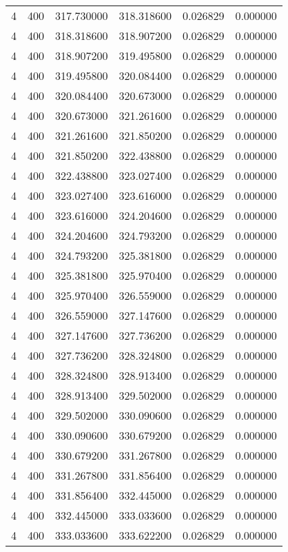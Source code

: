 \begin{longtable}{rrrrrr}
4 & 400 & 317.730000 & 318.318600 & 0.026829 & 0.000000 \\
4 & 400 & 318.318600 & 318.907200 & 0.026829 & 0.000000 \\
4 & 400 & 318.907200 & 319.495800 & 0.026829 & 0.000000 \\
4 & 400 & 319.495800 & 320.084400 & 0.026829 & 0.000000 \\
4 & 400 & 320.084400 & 320.673000 & 0.026829 & 0.000000 \\
4 & 400 & 320.673000 & 321.261600 & 0.026829 & 0.000000 \\
4 & 400 & 321.261600 & 321.850200 & 0.026829 & 0.000000 \\
4 & 400 & 321.850200 & 322.438800 & 0.026829 & 0.000000 \\
4 & 400 & 322.438800 & 323.027400 & 0.026829 & 0.000000 \\
4 & 400 & 323.027400 & 323.616000 & 0.026829 & 0.000000 \\
4 & 400 & 323.616000 & 324.204600 & 0.026829 & 0.000000 \\
4 & 400 & 324.204600 & 324.793200 & 0.026829 & 0.000000 \\
4 & 400 & 324.793200 & 325.381800 & 0.026829 & 0.000000 \\
4 & 400 & 325.381800 & 325.970400 & 0.026829 & 0.000000 \\
4 & 400 & 325.970400 & 326.559000 & 0.026829 & 0.000000 \\
4 & 400 & 326.559000 & 327.147600 & 0.026829 & 0.000000 \\
4 & 400 & 327.147600 & 327.736200 & 0.026829 & 0.000000 \\
4 & 400 & 327.736200 & 328.324800 & 0.026829 & 0.000000 \\
4 & 400 & 328.324800 & 328.913400 & 0.026829 & 0.000000 \\
4 & 400 & 328.913400 & 329.502000 & 0.026829 & 0.000000 \\
4 & 400 & 329.502000 & 330.090600 & 0.026829 & 0.000000 \\
4 & 400 & 330.090600 & 330.679200 & 0.026829 & 0.000000 \\
4 & 400 & 330.679200 & 331.267800 & 0.026829 & 0.000000 \\
4 & 400 & 331.267800 & 331.856400 & 0.026829 & 0.000000 \\
4 & 400 & 331.856400 & 332.445000 & 0.026829 & 0.000000 \\
4 & 400 & 332.445000 & 333.033600 & 0.026829 & 0.000000 \\
4 & 400 & 333.033600 & 333.622200 & 0.026829 & 0.000000 \\

\end{longtable}
